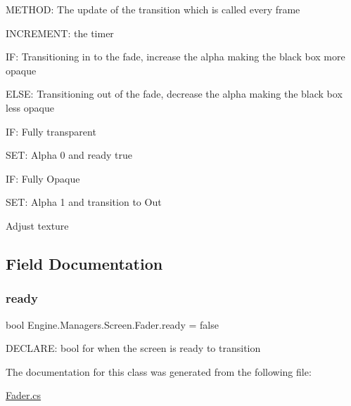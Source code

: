 M\+E\+T\+H\+OD\+: The update of the transition which is called every frame 

I\+N\+C\+R\+E\+M\+E\+NT\+: the timer

IF\+: Transitioning in to the fade, increase the alpha making the black box more opaque

E\+L\+SE\+: Transitioning out of the fade, decrease the alpha making the black box less opaque

IF\+: Fully transparent

S\+ET\+: Alpha 0 and ready true

IF\+: Fully Opaque

S\+ET\+: Alpha 1 and transition to Out

Adjust texture 

\subsection{Field Documentation}
\mbox{\label{a00534_aa2cfb68abbeb910ec086ddb3fc5a06c8}} 
\subsubsection{\texorpdfstring{ready}{ready}}
{\footnotesize\ttfamily bool Engine.\+Managers.\+Screen.\+Fader.\+ready = false}



D\+E\+C\+L\+A\+RE\+: bool for when the screen is ready to transition 



The documentation for this class was generated from the following file\+:\begin{DoxyCompactItemize}
\item 
\hyperlink{a00182}{Fader.\+cs}\end{DoxyCompactItemize}
